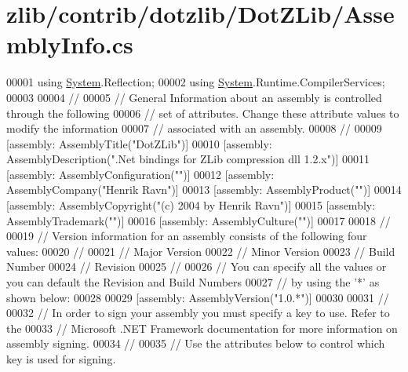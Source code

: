 \hypertarget{zlib_2contrib_2dotzlib_2_dot_z_lib_2_assembly_info_8cs_source}{}\section{zlib/contrib/dotzlib/\+Dot\+Z\+Lib/\+Assembly\+Info.cs}
\label{zlib_2contrib_2dotzlib_2_dot_z_lib_2_assembly_info_8cs_source}

\begin{DoxyCode}
00001 \textcolor{keyword}{using} \hyperlink{namespace_system}{System}.Reflection;
00002 \textcolor{keyword}{using} \hyperlink{namespace_system}{System}.Runtime.CompilerServices;
00003 
00004 \textcolor{comment}{//}
00005 \textcolor{comment}{// General Information about an assembly is controlled through the following}
00006 \textcolor{comment}{// set of attributes. Change these attribute values to modify the information}
00007 \textcolor{comment}{// associated with an assembly.}
00008 \textcolor{comment}{//}
00009 [assembly: AssemblyTitle(\textcolor{stringliteral}{"DotZLib"})]
00010 [assembly: AssemblyDescription(\textcolor{stringliteral}{".Net bindings for ZLib compression dll 1.2.x"})]
00011 [assembly: AssemblyConfiguration(\textcolor{stringliteral}{""})]
00012 [assembly: AssemblyCompany(\textcolor{stringliteral}{"Henrik Ravn"})]
00013 [assembly: AssemblyProduct(\textcolor{stringliteral}{""})]
00014 [assembly: AssemblyCopyright(\textcolor{stringliteral}{"(c) 2004 by Henrik Ravn"})]
00015 [assembly: AssemblyTrademark(\textcolor{stringliteral}{""})]
00016 [assembly: AssemblyCulture(\textcolor{stringliteral}{""})]
00017 
00018 \textcolor{comment}{//}
00019 \textcolor{comment}{// Version information for an assembly consists of the following four values:}
00020 \textcolor{comment}{//}
00021 \textcolor{comment}{//      Major Version}
00022 \textcolor{comment}{//      Minor Version}
00023 \textcolor{comment}{//      Build Number}
00024 \textcolor{comment}{//      Revision}
00025 \textcolor{comment}{//}
00026 \textcolor{comment}{// You can specify all the values or you can default the Revision and Build Numbers}
00027 \textcolor{comment}{// by using the '*' as shown below:}
00028 
00029 [assembly: AssemblyVersion(\textcolor{stringliteral}{"1.0.*"})]
00030 
00031 \textcolor{comment}{//}
00032 \textcolor{comment}{// In order to sign your assembly you must specify a key to use. Refer to the}
00033 \textcolor{comment}{// Microsoft .NET Framework documentation for more information on assembly signing.}
00034 \textcolor{comment}{//}
00035 \textcolor{comment}{// Use the attributes below to control which key is used for signing.}

\end{DoxyCode}
